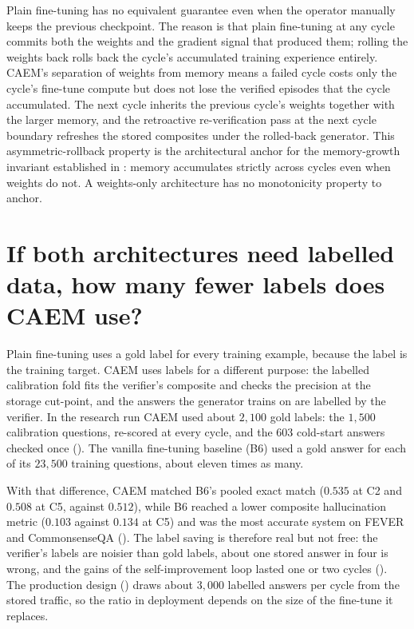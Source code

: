 Plain fine-tuning has no equivalent guarantee even when the operator manually keeps the previous checkpoint. The reason is that plain fine-tuning at any cycle commits both the weights and the gradient signal that produced them; rolling the weights back rolls back the cycle's accumulated training experience entirely. CAEM's separation of weights from memory means a failed cycle costs only the cycle's fine-tune compute but does not lose the verified episodes that the cycle accumulated. The next cycle inherits the previous cycle's weights together with the larger memory, and the retroactive re-verification pass at the next cycle boundary refreshes the stored composites under the rolled-back generator. This asymmetric-rollback property is the architectural anchor for the memory-growth invariant established in : memory accumulates strictly across cycles even when weights do not. A weights-only architecture has no monotonicity property to anchor.


\section[Label efficiency]{If both architectures need labelled data, how many fewer labels does CAEM use?}
\label{app:qa-sample-efficiency}

Plain fine-tuning uses a gold label for every training example, because the label is the training target. CAEM uses labels for a different purpose: the labelled calibration fold fits the verifier's composite and checks the precision at the storage cut-point, and the answers the generator trains on are labelled by the verifier. In the research run CAEM used about $2{,}100$ gold labels: the $1{,}500$ calibration questions, re-scored at every cycle, and the $603$ cold-start answers checked once (). The vanilla fine-tuning baseline (B6) used a gold answer for each of its $23{,}500$ training questions, about eleven times as many.

With that difference, CAEM matched B6's pooled exact match ($0.535$ at C2 and $0.508$ at C5, against $0.512$), while B6 reached a lower composite hallucination metric ($0.103$ against $0.134$ at C5) and was the most accurate system on FEVER and CommonsenseQA (). The label saving is therefore real but not free: the verifier's labels are noisier than gold labels, about one stored answer in four is wrong, and the gains of the self-improvement loop lasted one or two cycles (). The production design () draws about $3{,}000$ labelled answers per cycle from the stored traffic, so the ratio in deployment depends on the size of the fine-tune it replaces.

